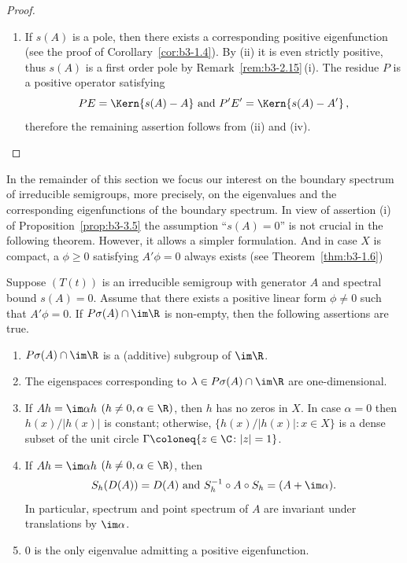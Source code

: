 \begin{proof}
\begin{enumerate}[\upshape (i), wide, labelindent=.25em]
	\item 
	If\/ $s(A)$ is a pole, then there exists a corresponding positive eigenfunction (see the proof of Corollary~\ref{cor:b3-1.4}).
	By (ii) it is even strictly positive, thus $s(A)$ is a first order pole by Remark~\ref{rem:b3-2.15}\,(i).
	The residue $P$ is a positive operator satisfying 
    \[
    PE = \Kern{s(A) - A} \text{ and } P'E' = \Kern{s(A) - A'}\,,
    \]
    therefore the remaining assertion follows from (ii) and (iv).
    \qedhere
	\end{enumerate}
	\end{proof}
In the remainder of this section we focus our interest on the boundary spectrum of irreducible semigroups, more precisely, on the eigenvalues and the corresponding eigenfunctions of the boundary spectrum. 
In view of assertion (i) of Proposition~\ref{prop:b3-3.5} the assumption \enquote{$s(A) = 0$} is not crucial in the following theorem. 
However, it allows a simpler formulation. 
And in case $X$ is compact, a $\phi \geq 0$ satisfying $A'\phi = 0$ always exists (see Theorem~\ref{thm:b3-1.6})
\begin{theorem}\label{thm:b3-3.6}
%
	Suppose $(T(t))$ is an irreducible semigroup with generator $A$ and spectral bound $s(A) = 0$.
	Assume that there exists a positive linear form $\phi \neq 0$ such that $A'\phi = 0$. 
	If\/ $P\sigma(A)\cap \im\R$ is non-empty, then the following assertions are true.
	\begin{enumerate}[\upshape (i)]
		\item 
		$P\sigma(A)\cap \im\R$ is a (additive) subgroup of\/ $\im \R$.
	
		\item 
		The eigenspaces corresponding to $\lambda \in P\sigma(A)\cap \im\R$ are one-dimensional.
	
		\item 
		If\/ $Ah = \im\alpha h$ $(h \neq 0, \alpha \in \R)$, then $h$ has no zeros in $X$.
		In case $\alpha = 0$ then $h(x)/|h(x)|$ is constant; otherwise, $\{h(x)/|h(x)| \colon x \in X\}$ is a dense subset of the unit circle\/ $\Gamma \coloneq \{z\in \C \colon |z|=1\}$.
	
		\item 
		If\/ $Ah = \im\alpha h$ $(h \neq 0, \alpha \in \R)$, then
		\begin{equation}\label{eq:b3-3.5}
			S_{h}(D(A)) = D(A) \text{ and } S_{h}^{-1}\circ A \circ S_{h} = (A + \im\alpha).
		\end{equation}
		In particular, spectrum and point spectrum of\/ $A$ are invariant under translations by $\im \alpha$.
	
		\item 
		$0$ is the only eigenvalue admitting a positive eigenfunction.
	\end{enumerate}
\end{theorem}
